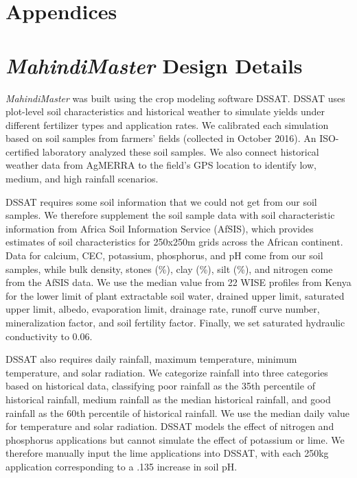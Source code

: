\documentclass[12pt,letterpaper]{article}
\begin{document}


\newpage
\appendix 
{}
\renewcommand{\thesection}{\Alph{section}}

\section*{Appendices}
\section{\textit{MahindiMaster} Design Details}\label{sec:appendix-design}
\setcounter{table}{0}
\renewcommand{\thetable}{\Alph{section}\arabic{table}}

\textit{MahindiMaster} was built using the crop modeling software DSSAT. DSSAT uses plot-level soil characteristics and historical weather to simulate yields under different fertilizer types and application rates. We calibrated each simulation based on soil samples  from farmers' fields (collected in October 2016). An ISO-certified laboratory analyzed these soil samples. We also connect historical weather data from AgMERRA to the field's GPS location to identify low, medium, and high rainfall scenarios. 

DSSAT requires some soil information that we could not get from our soil samples. We therefore supplement the soil sample data with soil characteristic information from Africa Soil Information Service (AfSIS), which provides estimates of soil characteristics for 250x250m grids across the African continent. Data for calcium, CEC, potassium, phosphorus, and pH come from our soil samples, while bulk density, stones (\%), clay (\%), silt (\%), and nitrogen come from the AfSIS data. We use the median value from 22 WISE profiles from Kenya for the lower limit of plant extractable soil water, drained upper limit, saturated upper limit, albedo, evaporation limit, drainage rate, runoff curve number, mineralization factor, and soil fertility factor. Finally, we set saturated hydraulic conductivity to 0.06. 

DSSAT also requires daily rainfall, maximum temperature, minimum temperature, and solar radiation. We categorize rainfall into three categories based on historical data, classifying poor rainfall as the 35th percentile of historical rainfall, medium rainfall as the median historical rainfall, and good rainfall as the 60th percentile of historical rainfall. We use the median daily value for temperature and solar radiation. DSSAT models the effect of nitrogen and phosphorus applications but cannot simulate the effect of potassium or lime. We therefore manually input the lime applications into DSSAT, with each 250kg application corresponding to a .135 increase in soil pH.
\end{document}
